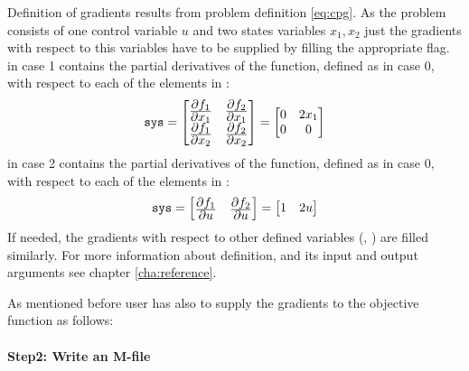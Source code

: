 {\small }

Definition of gradients results from problem definition
\eqref{eq:cpg}. As the problem consists of one control variable $u$
and two states variables $x_{1}, x_{2}$ just the gradients with
respect to this variables have to be supplied by filling the
appropriate flag.\\ 
 in case 1 contains the partial derivatives of the
 function, defined as  in case 0, with
respect to each of the elements in : 
\begin{displaymath}
\texttt{sys} = 
\begin{bmatrix}
\frac{\displaystyle \partial{f_{1}}}{\displaystyle \partial{x_{1}}} &
\frac{\displaystyle \partial{f_{2}}}{\displaystyle \partial{x_{1}}}\\
\frac{\displaystyle \partial{f_{1}}}{\displaystyle \partial{x_{2}}} &
\frac{\displaystyle \partial{f_{2}}}{\displaystyle \partial{x_{2}}}
\end{bmatrix} =
\begin{bmatrix}
0 & 2x_{1}\\
0 & 0
\end{bmatrix}
\end{displaymath}
 in case 2 contains the partial derivatives of the
 function, defined as  in case 0, with
respect to each of the elements in :
\begin{displaymath}
\texttt{sys} = 
\begin{bmatrix}
\frac{\displaystyle \partial{f_{1}}}{\displaystyle \partial{u}} &
\frac{\displaystyle \partial{f_{2}}}{\displaystyle \partial{u}}
\end{bmatrix} =
\begin{bmatrix}
1 & 2u
\end{bmatrix} 
\end{displaymath}
If needed, the gradients with respect to other defined variables
(, ) are filled similarly. For more information
about  definition, and its input and output arguments
see chapter \ref{cha:reference}.

As mentioned before user has also to supply the gradients to the
objective function  as follows: 

\paragraph{Step2: Write an M-file~}

